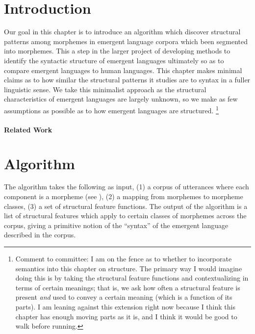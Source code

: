 \newcommand\tsc\textsc

\section{Introduction}

Our goal in this chapter is to introduce an algorithm which discover structural patterns among morphemes in emergent language corpora which been segmented into morphemes.
This a step in the larger project of developing methods to identify the syntactic structure of emergent languages ultimately so as to compare emergent languages to human languages.
This chapter makes minimal claims as to how similar the structural patterns it studies are to syntax in a fuller linguistic sense.
We take this minimalist approach as the structural characteristics of emergent languages are largely unknown, so we make as few assumptions as possible as to how emergent languages are structured.
\unskip\footnote{Comment to committee: I am on the fence as to whether to incorporate semantics into this chapter on structure. The primary way I would imagine doing this is by taking the structural feature functions and contextualizing in terms of certain meanings; that is, we ask how often a structural feature is present \emph{and} used to convey a certain meaning (which is a function of its parts).  I am leaning against this extension right now because I think this chapter has enough moving parts as it is, and I think it would be good to walk before running.}

\paragraph{Related Work}
\phantom{}%

\section{Algorithm}

The algorithm takes the following as input,
  (1) a corpus of utterances where each component is a morpheme (see ),
  (2) a mapping from morphemes to morpheme classes,
  (3) a set of structural feature functions.
The output of the algorithm is a list of structural features which apply to certain classes of morphemes across the corpus, giving a primitive notion of the ``syntax'' of the emergent language described in the corpus.


